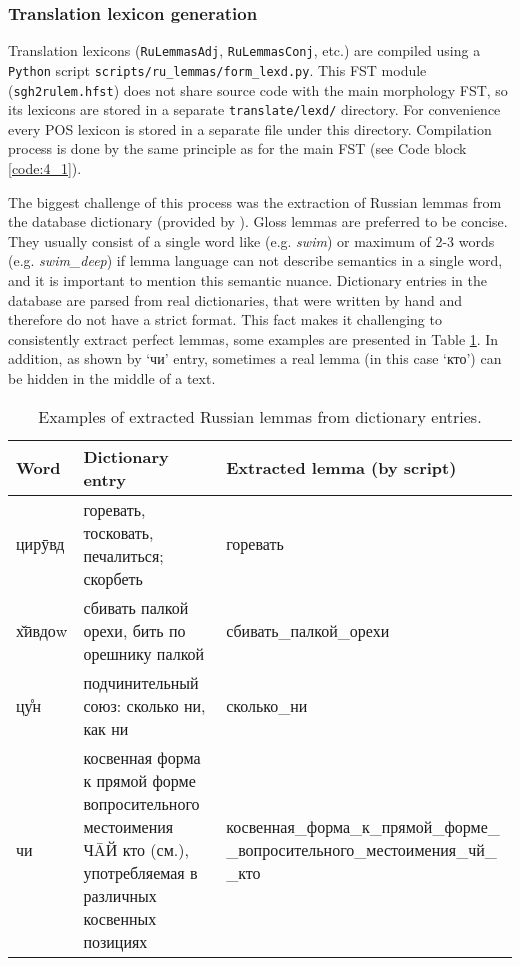 \subsubsection*{Translation lexicon generation} \label{stem_lexicons}
Translation lexicons (\texttt{RuLemmasAdj}, \texttt{RuLemmasConj}, etc.) are compiled using a \texttt{Python} script \texttt{scripts/ru\_lemmas/form\_lexd.py}. This FST module (\texttt{sgh2rulem.hfst}) does not share source code with the main morphology FST, so its lexicons are stored in a separate \texttt{translate/lexd/} directory. For convenience every POS lexicon is stored in a separate file under this directory. Compilation process is done by the same principle as for the main FST (see Code block \ref{code:4_1}).

The biggest challenge of this process was the extraction of Russian lemmas from the database dictionary (provided by \textcite{makarov_digital_2022}). Gloss lemmas are preferred to be concise. They usually consist of a single word like (e.g. \textit{swim}) or maximum of 2-3 words (e.g. \textit{swim\_deep}) if lemma language can not describe semantics in a single word, and it is important to mention this semantic nuance. Dictionary entries in the database are parsed from real dictionaries, that were written by hand and therefore do not have a strict format. This fact makes it challenging to consistently extract perfect lemmas, some examples are presented in Table \ref{Tab:8_1}. In addition, as shown by `чи' entry, sometimes a real lemma (in this case `кто') can be hidden in the middle of a text. 

\begin{table}[!htbp]
    \begin{center}
        \begin{tabular}{|p{3cm}|p{5cm}|p{7cm}|}
            \hline
            \textbf{Word} & \textbf{Dictionary entry} & \textbf{Extracted lemma (by script)} \\
            \hline
            \hline
            цирӯвд & горевать, тосковать, печалиться; скорбеть & горевать \\
            \hline
            х̌ӣвдоw & сбивать палкой орехи, бить по орешнику палкой & сбивать\_палкой\_орехи \\
            \hline
            цу̊н & подчинительный союз: сколько ни, как ни & сколько\_ни \\
            \hline
            чи & косвенная форма к прямой форме вопросительного местоимения ЧĀЙ кто (см.), употребляемая в различных косвенных позициях & косвенная\_форма\_к\_прямой\_форме\_ \_вопросительного\_местоимения\_чй\_ \_кто \\
            \hline
        \end{tabular}
        \caption{Examples of extracted Russian lemmas from dictionary entries.}
        \label{Tab:8_1}
    \end{center}
\end{table}

